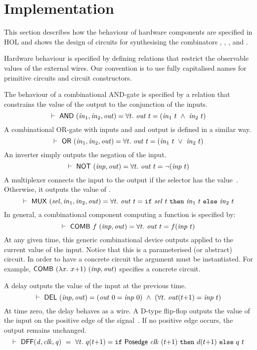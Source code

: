 \documentclass{llncs}
\begin{document}
\section{Implementation}
\label{secImplementation}
This section describes how the behaviour of
hardware components are specified in HOL
and shows the design of circuits for
synthesising the combinators ,
, ,  and .

Hardware behaviour is specified by defining
relations that restrict the observable values of the 
external wires. Our convention is to use fully 
capitalised names for primitive circuits and 
circuit constructors.

The behaviour of a combinational AND-gate
is specified by a relation that constrains the value of the output
to the conjunction of the inputs.
\[
\TURNST\ \DEF{AND}\ (\sVAR{in}{1},\sVAR{in}{2},\VAR{out}) = 
   \forall t.\ \VAR{out}\ t = (\sVAR{in}{1}\ t\ \AND\ \sVAR{in}{2}\ t)
\]
A combinational OR-gate with inputs  and 
and output  is defined in a similar way.
\[
\TURNST\ \DEF{OR}\ (\sVAR{in}{1},\sVAR{in}{2},\VAR{out}) = 
   \forall t.\ \VAR{out}\ t = (\sVAR{in}{1}\ t\ \OR\ \sVAR{in}{2}\ t)
\]
An inverter simply outputs the negation of the input.
\[
\vdash\ \mathsf{NOT}\ (\mathit{inp},\mathit{out}) = 
   \forall t.\ \mathit{out}\ t = \neg(\mathit{inp}\ t)
\]
A multiplexer connects the input 
to the output  if the selector  has the value~.
Otherwise, it outputs the value of .
\[
\TURNST\ \DEF{MUX}\ (\VAR{sel},\sVAR{in}{1},\sVAR{in}{2},\VAR{out}) = 
   \forall t.\ \VAR{out}\ t = \IF{\VAR{sel}\ t}{\sVAR{in}{1}\ t}{\sVAR{in}{2}\ t}
\]
In general, a combinational component computing a function 
is specified by:
\[
\vdash\ \mathsf{COMB}\ f\ \mathit{(inp,out)} = \forall t.\ \mathit{out}\ t = f (\mathit{inp}\ t)
\]
At any given time, this generic combinational device
outputs  applied to the current value
of the input. Notice that this is a parameterised
(or abstract) circuit. In order to have a concrete circuit
the argument  must be instantiated.
For example, $\DEF{COMB}\ (\lambda x.\ x{+}1)\ (\VAR{inp,out})$
specifies a concrete circuit.

A delay outputs the value of the input at the previous time.
\[
\TURNST\ \DEF{DEL}\ (\VAR{inp},\VAR{out}) = 
    (\VAR{out}\ 0 = \VAR{inp}\ 0)\ \AND\ 
    (\forall t.\ \VAR{out} (t{+}1) = \VAR{inp}\ t)
\]
At time zero, the delay behaves as a wire.
A D-type flip-flop  outputs the value of the input  on the
positive edge of the signal~\VAR{clk}.
If no positive edge occurs, the output  remains
unchanged.
\[
\vdash\ \mathsf{DFF} (\mathit{d,clk,q})~ =~
 \forall t.\ q (t{+}1) =  \texttt{if}~\mathsf{Posedge}\ \mathit{clk}\ (t{+}1)~\texttt{then}~d (t{+}1)~\texttt{else}~q\ t
\]
\end{document}
